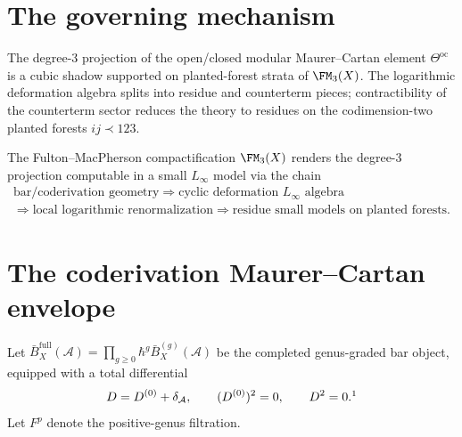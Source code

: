 \label{chap:fm3-planted-forest-synthesis}

\providecommand{\MC}{\mathrm{MC}}
\providecommand{\Defcyc}{\operatorname{Def}_{\mathrm{cyc}}}
\providecommand{\Cone}{\operatorname{Cone}}
\providecommand{\Tot}{\operatorname{Tot}}
\providecommand{\adop}{\operatorname{ad}}
\providecommand{\cA}{\mathcal A}
\providecommand{\cB}{\mathcal B}
\providecommand{\cC}{\mathcal C}
\providecommand{\cD}{\mathcal D}
\providecommand{\cF}{\mathcal F}
\providecommand{\cL}{\mathcal L}
\providecommand{\cR}{\mathcal R}
\providecommand{\Q}{\mathbf Q}
\providecommand{\C}{\mathbf C}
\providecommand{\Pone}{\mathbf P^1}
\providecommand{\Aone}{\mathbf A^1}

\section{The governing mechanism}

The degree-3 projection of the open/closed modular Maurer--Cartan element $\Theta^{\mathrm{oc}}$ is a cubic shadow supported on planted-forest strata of $\FM_3(X)$. The logarithmic deformation algebra splits into residue and counterterm pieces; contractibility of the counterterm sector reduces the theory to residues on the codimension-two planted forests $ij\prec 123$.

The Fulton--MacPherson compactification $\FM_3(X)$ renders the degree-3 projection computable in a small $L_\infty$ model via the chain
\begin{equation}
\label{eq:grand-chain}
\begin{gathered}
\text{bar/coderivation geometry}
\Longrightarrow
\text{cyclic deformation }L_\infty\text{ algebra}\\
\Longrightarrow
\text{local logarithmic renormalization}
\Longrightarrow
\text{residue small models on planted forests}.
\end{gathered}
\end{equation}

\section{The coderivation Maurer--Cartan envelope}

Let $\bar B_X^{\mathrm{full}}(\cA)=\prod_{g\ge 0}\hbar^g\bar B_X^{(g)}(\cA)$ be the
completed genus-graded bar object, equipped with a total differential
\[
D = D^{(0)} + \delta_{\cA},
\qquad
(D^{(0)})^2=0,
\qquad
D^2=0.\footnotemark
\]
%
Let $F^p$ denote the positive-genus filtration.

